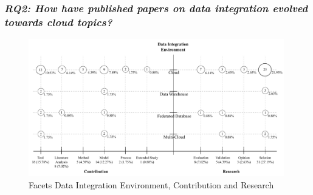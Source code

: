 


\subsubsection{\textit{RQ2: How have published papers on data integration evolved towards cloud topics?}}
\begin{figure}[h]
\centering
\includegraphics[width=0.99\textwidth]{figs/bubble-charts/DI-Environment-Contribution-Research.pdf}
\caption{Facets Data Integration Environment, Contribution and Research}\label{fig:facet2}
\end{figure}

